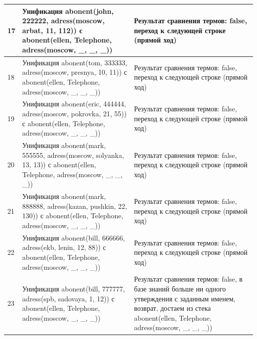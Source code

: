 \documentclass[a4paper,14pt]{extreport} %
\begin{document}
\begin{longtable}{|p{1.1cm}|p{8.5cm}|p{7cm}|}
	17 & Унификация abonent(john, 222222, adress(moscow, arbat, 11, 112)) с abonent(ellen, Telephone, adress(moscow, \_, \_, \_)) & Результат сравнения термов: false, переход к следующей строке (прямой ход) \\ \hline
	18 & Унификация abonent(tom, 333333, adress(moscow, presnya, 10, 11)) с abonent(ellen, Telephone, adress(moscow, \_, \_, \_)) & Результат сравнения термов: false, переход к следующей строке (прямой ход) \\ \hline
	19 & Унификация abonent(eric, 444444, adress(moscow, pokrovka, 21, 55)) с abonent(ellen, Telephone, adress(moscow, \_, \_, \_)) & Результат сравнения термов: false, переход к следующей строке (прямой ход) \\ \hline
	20 & Унификация abonent(mark, 555555, adress(moscow, solyanka, 13, 13)) с abonent(ellen, Telephone, adress(moscow, \_, \_, \_)) & Результат сравнения термов: false, переход к следующей строке (прямой ход) \\ \hline
	21 & Унификация abonent(mark, 888888, adress(kazan, pushkin, 22, 130)) с abonent(ellen, Telephone, adress(moscow, \_, \_, \_)) & Результат сравнения термов: false, переход к следующей строке (прямой ход) \\ \hline
	22 & Унификация abonent(bill, 666666, adress(ekb, lenin, 12, 88)) с abonent(ellen, Telephone, adress(moscow, \_, \_, \_)) & Результат сравнения термов: false, переход к следующей строке (прямой ход) \\ \hline
	23 & Унификация abonent(bill, 777777, adress(spb, sadovaya, 1, 12)) с abonent(ellen, Telephone, adress(moscow, \_, \_, \_)) & Результат сравнения термов: false, в базе знаний больше ни одного утверждения с заданным именем, возврат, достаем из стека abonent(ellen, Telephone, adress(moscow, \_, \_, \_)) \\ \hline
	

\end{longtable}
\end{document}
